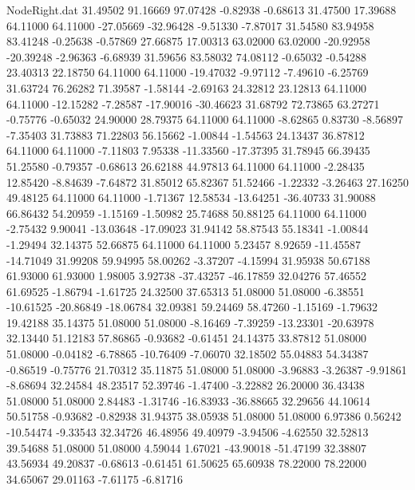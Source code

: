 \begin{filecontents}{NodeRight.dat}
  31.49502   91.16669   97.07428    -0.82938   -0.68613   31.47500   17.39688   64.11000   64.11000  -27.05669  -32.96428   -9.51330   -7.87017
  31.54580   83.94958   83.41248    -0.25638   -0.57869   27.66875   17.00313   63.02000   63.02000  -20.92958  -20.39248   -2.96363   -6.68939
  31.59656   83.58032   74.08112    -0.65032   -0.54288   23.40313   22.18750   64.11000   64.11000  -19.47032   -9.97112   -7.49610   -6.25769
  31.63724   76.26282   71.39587    -1.58144   -2.69163   24.32812   23.12813   64.11000   64.11000  -12.15282   -7.28587  -17.90016  -30.46623
  31.68792   72.73865   63.27271    -0.75776   -0.65032   24.90000   28.79375   64.11000   64.11000   -8.62865    0.83730   -8.56897   -7.35403
  31.73883   71.22803   56.15662    -1.00844   -1.54563   24.13437   36.87812   64.11000   64.11000   -7.11803    7.95338  -11.33560  -17.37395
  31.78945   66.39435   51.25580    -0.79357   -0.68613   26.62188   44.97813   64.11000   64.11000   -2.28435   12.85420   -8.84639   -7.64872
  31.85012   65.82367   51.52466    -1.22332   -3.26463   27.16250   49.48125   64.11000   64.11000   -1.71367   12.58534  -13.64251  -36.40733
  31.90088   66.86432   54.20959    -1.15169   -1.50982   25.74688   50.88125   64.11000   64.11000   -2.75432    9.90041  -13.03648  -17.09023
  31.94142   58.87543   55.18341    -1.00844   -1.29494   32.14375   52.66875   64.11000   64.11000    5.23457    8.92659  -11.45587  -14.71049
  31.99208   59.94995   58.00262    -3.37207   -4.15994   31.95938   50.67188   61.93000   61.93000    1.98005    3.92738  -37.43257  -46.17859
  32.04276   57.46552   61.69525    -1.86794   -1.61725   24.32500   37.65313   51.08000   51.08000   -6.38551  -10.61525  -20.86849  -18.06784
  32.09381   59.24469   58.47260    -1.15169   -1.79632   19.42188   35.14375   51.08000   51.08000   -8.16469   -7.39259  -13.23301  -20.63978
  32.13440   51.12183   57.86865    -0.93682   -0.61451   24.14375   33.87812   51.08000   51.08000   -0.04182   -6.78865  -10.76409   -7.06070
  32.18502   55.04883   54.34387    -0.86519   -0.75776   21.70312   35.11875   51.08000   51.08000   -3.96883   -3.26387   -9.91861   -8.68694
  32.24584   48.23517   52.39746    -1.47400   -3.22882   26.20000   36.43438   51.08000   51.08000    2.84483   -1.31746  -16.83933  -36.88665
  32.29656   44.10614   50.51758    -0.93682   -0.82938   31.94375   38.05938   51.08000   51.08000    6.97386    0.56242  -10.54474   -9.33543
  32.34726   46.48956   49.40979    -3.94506   -4.62550   32.52813   39.54688   51.08000   51.08000    4.59044    1.67021  -43.90018  -51.47199
  32.38807   43.56934   49.20837    -0.68613   -0.61451   61.50625   65.60938   78.22000   78.22000   34.65067   29.01163   -7.61175   -6.81716

\end{filecontents}
